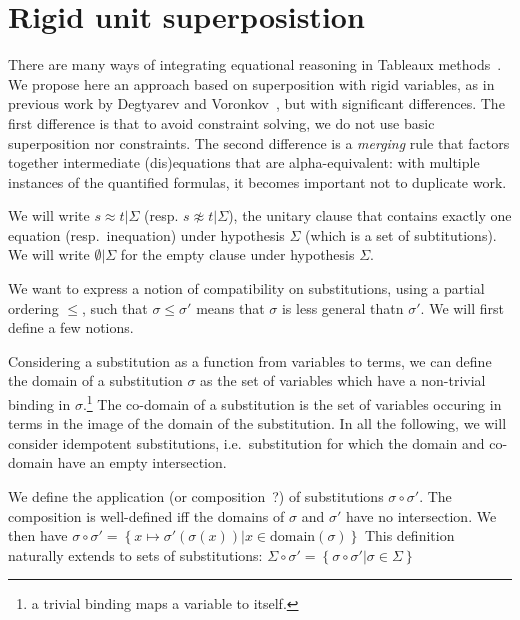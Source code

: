 
\section{Rigid unit superposistion}

\EnableBpAbbreviations{}

There are many ways of integrating equational reasoning in
Tableaux methods~\cite{brand1975proving,letz2002integration,backeman2015theorem,degtyarev1996you}.
We propose here an approach based on superposition with rigid variables,
as in previous work by Degtyarev and Voronkov~\cite{Degtyarev}, but with
significant differences.
The first difference is that to avoid constraint solving, we do not use
basic superposition nor constraints.
The second difference is a {\em merging} rule that factors together
intermediate (dis)equations that are alpha-equivalent:
with multiple instances of the quantified formulas, it becomes important
not to duplicate work.


We will write $s \approx t | \Sigma$ (resp. $s \not\approx t | \Sigma$),
the unitary clause that contains exactly one equation (resp.~inequation)
under hypothesis $\Sigma$ (which is a set of subtitutions).
We will write $\emptyset | \Sigma$ for the empty clause under hypothesis $\Sigma$.

We want to express a notion of compatibility on substitutions, using a
partial ordering $\leq$, such that $\sigma \leq \sigma'$ means that $\sigma$ is
less general thatn $\sigma'$. We will first define a few notions.


Considering a substitution as a function from variables to terms, we can define
the domain of a substitution $\sigma$ as the set of variables which have a non-trivial
binding in $\sigma$.\footnote{a trivial binding maps a variable to itself.}
The co-domain of a substitution is the set of variables occuring in terms in the image of
the domain of the substitution.
In all the following, we will consider idempotent substitutions, i.e.~substitution for which
the domain and co-domain have an empty intersection.


We define the application (or composition~?) of substitutions $\sigma \circ \sigma'$.
The composition is well-defined iff the domains of $\sigma$ and $\sigma'$ have no
intersection. We then have
$\sigma \circ \sigma' = \left\{ x \mapsto \sigma'(\sigma(x)) | x \in \text{domain}(\sigma) \right\}$
This definition naturally extends to sets of substitutions:
$\Sigma \circ \sigma' = \left\{ \sigma \circ \sigma' | \sigma \in \Sigma \right\}$


